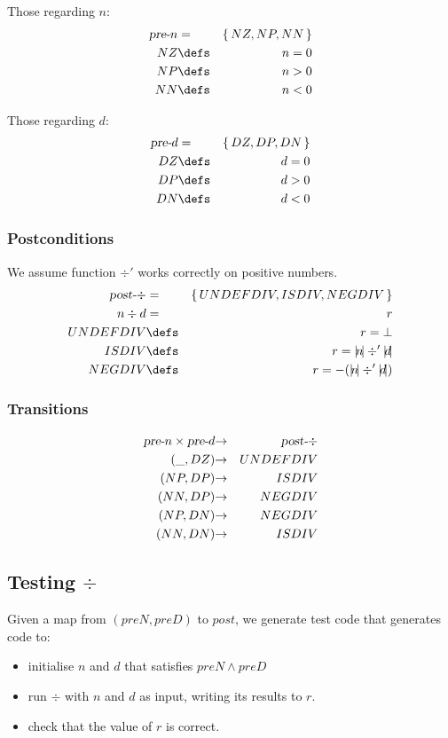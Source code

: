 Those regarding $n$:
\begin{eqnarray*}
   \pre n &=& \setof{NZ,NP,NN}
\\ NZ &\defs&  n = 0
\\ NP &\defs&  n > 0
\\ NN &\defs&  n < 0
\end{eqnarray*}

Those regarding $d$:
\begin{eqnarray*}
   \pre d &=& \setof{DZ,DP,DN}
\\ DZ &\defs&  d = 0
\\ DP &\defs&  d > 0
\\ DN &\defs&  d < 0
\end{eqnarray*}

\subsubsection{Postconditions}

We assume function $\div'$ works correctly on positive numbers. 
\begin{eqnarray*}
   \post\div &=& \setof{UNDEFDIV,ISDIV,NEGDIV}
\\ n \div d &=& r
\\ UNDEFDIV &\defs& r = \bot 
\\ ISDIV    &\defs& r = \abs n \div' \abs d  
\\ NEGDIV   &\defs& r = -(\abs n \div' \abs d) 
\end{eqnarray*}

\subsubsection{Transitions}

\begin{eqnarray*}
   \textsl{pre-}n\times\textsl{pre-}d &\mathbin{\rightarrow}& \textsl{post-}\div
\\ (\_,DZ) &\mathbin{\rightarrow}& UNDEFDIV
\\ (NP,DP) &\mathbin{\rightarrow}& ISDIV
\\ (NN,DP) &\mathbin{\rightarrow}& NEGDIV
\\ (NP,DN) &\mathbin{\rightarrow}& NEGDIV
\\ (NN,DN) &\mathbin{\rightarrow}& ISDIV
\end{eqnarray*}

\newpage
\subsection{Testing $\div$}

Given a map from $(preN,preD)$ to $post$,
we generate test code that generates code to:
\begin{itemize}
   \item initialise $n$ and $d$ that satisfies $preN \land preD$
   \item run $\div$ with $n$ and $d$ as input, writing its results to $r$.
   \item check that the value of $r$ is correct.
\end{itemize}

